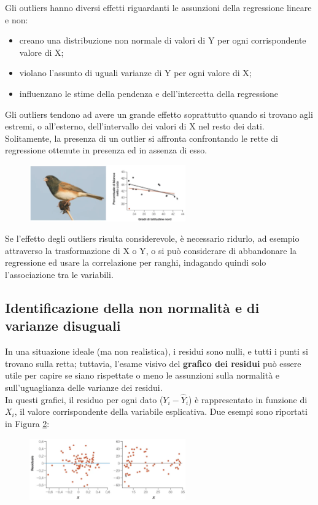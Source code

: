 \documentclass[10pt, draft]{book}
\newcommand{\tightlist}{%
\setlength{\itemsep}{1pt}\setlength{\parskip}{0pt}\setlength{\parsep}{0pt}}
\begin{document}
Gli outliers hanno diversi effetti riguardanti le assunzioni della regressione lineare e non:
\begin{itemize}\tightlist
    \item creano una distribuzione non normale di valori di Y per ogni corrispondente valore di X;
    \item violano l'assunto di uguali varianze di Y per ogni valore di X;
    \item influenzano le stime della pendenza e dell'intercetta della regressione
\end{itemize}
Gli outliers tendono ad avere un grande effetto soprattutto quando si trovano agli estremi, o all'esterno, dell'intervallo dei valori di X nel resto dei dati.\\
Solitamente, la presenza di un outlier si affronta confrontando le rette di regressione ottenute in presenza ed in assenza di esso.\\
\begin{figure}[H]
    \centering
    \includegraphics[width=0.6\textwidth]{fig17.5-2}
    \caption{\small{}}
    \label{fig17.5-2}
\end{figure}

Se l'effetto degli outliers risulta considerevole, è necessario ridurlo, ad esempio attraverso la trasformazione di X o Y, o si può considerare di abbandonare la regressione ed usare la correlazione per ranghi, indagando quindi solo l'associazione tra le variabili.

\subsection{Identificazione della non normalità e di varianze disuguali}

In una situazione ideale (ma non realistica), i residui sono nulli, e tutti i punti si trovano sulla retta; tuttavia, l'esame visivo del \textbf{grafico dei residui} può essere utile per capire se siano rispettate o meno le assunzioni sulla normalità e sull'uguaglianza delle varianze dei residui.\\
In questi grafici, il residuo per ogni dato ($Y_i-\hat{Y}_i$) è rappresentato in funzione di $X_i$, il valore corrispondente della variabile esplicativa. Due esempi sono riportati in Figura \ref{fig17.5-4}:\\
\begin{figure}[H]
    \centering
    \includegraphics[width=0.6\textwidth]{fig17.5-4}
    \caption{\small{}}
    \label{fig17.5-4}
\end{figure}
\end{document}

